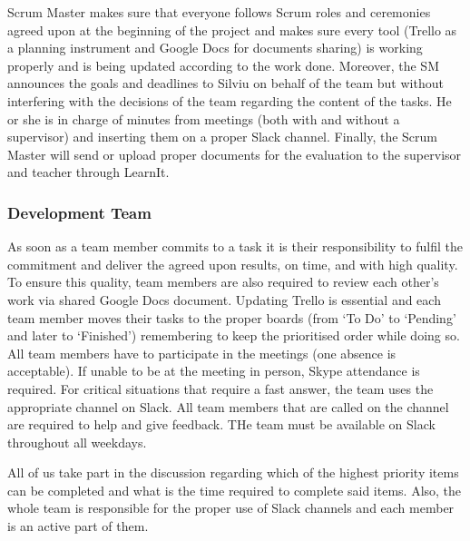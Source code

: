 Scrum Master makes sure that everyone follows Scrum roles and ceremonies agreed upon at the beginning of the project and makes sure every tool (Trello as a planning instrument and Google Docs for documents sharing) is working properly and is being updated according to the work done.
Moreover, the SM announces the goals and deadlines to Silviu on behalf of the team but without interfering with the decisions of the team regarding the content of the tasks. He or she is in charge of minutes from meetings (both with and without a supervisor) and inserting them on a proper Slack channel. Finally, the Scrum Master will send or upload proper documents for the evaluation to the supervisor and teacher through LearnIt.

\subsubsection{Development Team}
As soon as a team member commits to a task it is their responsibility to fulfil the commitment and deliver the agreed upon results, on time, and with high quality. To ensure this quality, team members are also required to review each other's work via shared Google Docs document. Updating Trello is essential and each team member moves their tasks to the proper boards (from ‘To Do’ to ‘Pending’ and later to ‘Finished’) remembering to keep the prioritised order while doing so. All team members have to participate in the meetings (one absence is acceptable). If unable to be at the meeting in person, Skype attendance is required. For critical situations that require a fast answer, the team uses the appropriate channel on Slack. All team members that are called on the channel are required to help and give feedback. THe team must be available on Slack throughout all weekdays.

All of us take part in the discussion regarding which of the highest priority items can be completed and what is the time required to complete said items. Also, the whole team is responsible for the proper use of Slack channels and each member is an active part of them.
